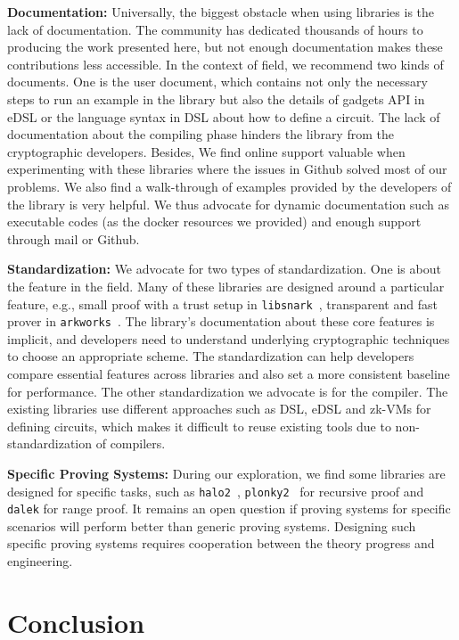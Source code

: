\documentclass[letterpaper,twocolumn,10pt]{article}
\theoremstyle{definition}
\newcommand{\mypara}[1]{\noindent\textbf{{#1: }}}
\newcommand{\zk}{\text{zk-SNARK}\xspace}
\newcommand{\lib}[1]{\texttt{#1}\xspace}
\begin{document}
\mypara{Documentation} Universally, the biggest obstacle when using \zk libraries is the lack of documentation. The community has dedicated thousands of hours to producing the work presented here, but not enough documentation makes these contributions less accessible. In the context of \zk field, we recommend two kinds of documents. One is the user document, which contains not only the necessary steps to run an example in the library but also the details of gadgets API in eDSL or the language syntax in DSL about how to define a circuit. The lack of documentation about the compiling phase hinders the library from the cryptographic developers. Besides, We find online support valuable when experimenting with these libraries where the issues in Github solved most of our problems. We also find a walk-through of examples provided by the developers of the library is very helpful. We thus advocate for dynamic documentation such as executable codes (as the docker resources we provided) and enough support through mail or Github. 

\mypara{Standardization} We advocate for two types of standardization. One is about the feature in the \zk field. Many of these libraries are designed around a particular feature, e.g., small proof with a trust setup in \lib{libsnark}~\cite{libsnark}, transparent and fast prover in \lib{arkworks}~\cite{arkworks}. The library's documentation about these core features is implicit, and developers need to understand underlying cryptographic techniques to choose an appropriate scheme. The standardization can help developers compare essential features across libraries and also set a more consistent baseline for performance. The other standardization we advocate is for the compiler. The existing libraries use different approaches such as DSL, eDSL and zk-VMs for defining circuits, which makes it difficult to reuse existing tools due to non-standardization of compilers.

\mypara{Specific Proving Systems} During our exploration, we find some libraries are designed for specific tasks, such as \lib{halo2}~\cite{halo2}, \lib{plonky2}~\cite{plonky2} for recursive proof and \lib{dalek} \cite{dalek-bulletproofs} for range proof. It remains an open question if proving systems for specific scenarios will perform better than generic proving systems. Designing such specific proving systems requires cooperation between the theory progress and engineering.  

\section{Conclusion}
\end{document}
